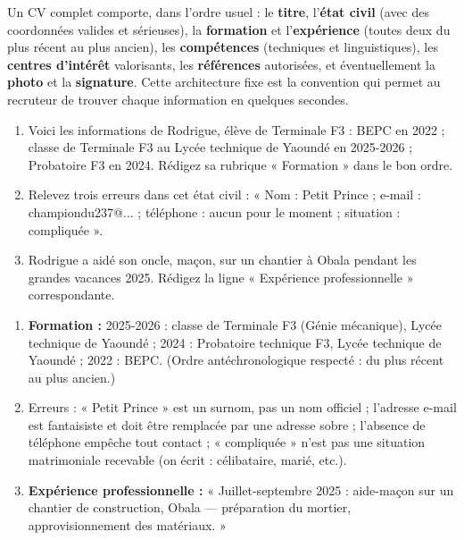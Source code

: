 \documentclass[11pt]{article}
\begin{document}
\begin{aretenir}
Un CV complet comporte, dans l'ordre usuel : le \textbf{titre}, l'\textbf{état civil} (avec des coordonnées valides et sérieuses), la \textbf{formation} et l'\textbf{expérience} (toutes deux du plus récent au plus ancien), les \textbf{compétences} (techniques et linguistiques), les \textbf{centres d'intérêt} valorisants, les \textbf{références} autorisées, et éventuellement la \textbf{photo} et la \textbf{signature}. Cette architecture fixe est la convention qui permet au recruteur de trouver chaque information en quelques secondes.
\end{aretenir}

\begin{exercice}
\begin{enumerate}
\item Voici les informations de Rodrigue, élève de Terminale F3 : BEPC en 2022 ; classe de Terminale F3 au Lycée technique de Yaoundé en 2025-2026 ; Probatoire F3 en 2024. Rédigez sa rubrique « Formation » dans le bon ordre.
\item Relevez trois erreurs dans cet état civil : « Nom : Petit Prince ; e-mail : championdu237@... ; téléphone : aucun pour le moment ; situation : compliquée ».
\item Rodrigue a aidé son oncle, maçon, sur un chantier à Obala pendant les grandes vacances 2025. Rédigez la ligne « Expérience professionnelle » correspondante.
\end{enumerate}
\end{exercice}

\begin{corrige}
\begin{enumerate}
\item \textbf{Formation :} 2025-2026 : classe de Terminale F3 (Génie mécanique), Lycée technique de Yaoundé ; 2024 : Probatoire technique F3, Lycée technique de Yaoundé ; 2022 : BEPC. (Ordre antéchronologique respecté : du plus récent au plus ancien.)
\item Erreurs : « Petit Prince » est un surnom, pas un nom officiel ; l'adresse e-mail est fantaisiste et doit être remplacée par une adresse sobre ; l'absence de téléphone empêche tout contact ; « compliquée » n'est pas une situation matrimoniale recevable (on écrit : célibataire, marié, etc.).
\item \textbf{Expérience professionnelle :} « Juillet-septembre 2025 : aide-maçon sur un chantier de construction, Obala — préparation du mortier, approvisionnement des matériaux. »
\end{enumerate}
\end{corrige}
\end{document}
